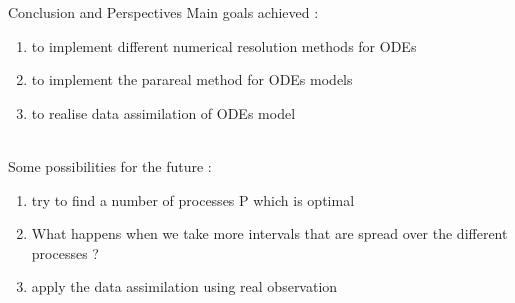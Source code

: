\documentclass[10pt,xcolor={table,dvipsnames},t]{beamer}
\begin{document}
	\begin{frame}{Conclusion and Perspectives}
		Main goals achieved :
		\begin{enumerate}[\textbullet]
			\item to implement different numerical resolution methods for ODEs
			\item to implement the parareal method for ODEs models
			\item to realise data assimilation of ODEs model
		\end{enumerate} \; \\
	
		Some possibilities for the future :
		\begin{enumerate}[\textbullet]
			\item try to find a number of processes P which is optimal
			\item What happens when we take more intervals that are spread over the different processes ?
			\item apply the data assimilation using real observation 
		\end{enumerate}
	\end{frame}
	
\end{document}
